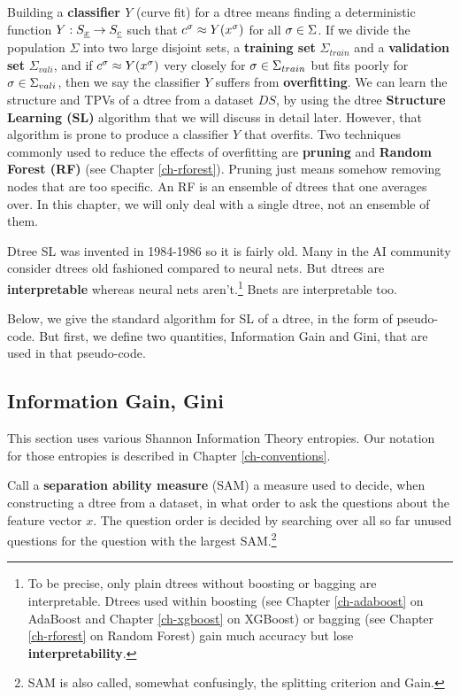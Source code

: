 Building a {\bf classifier $Y$} 
(curve fit) for a dtree means
finding a deterministic
function $Y:S_\rvx\rarrow S_\rvc$ 
such that 
$c^\sigma \approx Y(x^\sigma)$
for all $\sigma\in \Sigma$.
If we divide
the population
$\Sigma$ 
into two large 
disjoint
sets, a {\bf training set} $\Sigma_{train}$
and a {\bf validation set} $\Sigma_{vali}$,
and if $c^\sigma \approx Y(x^\sigma)$ very closely
for $\sigma\in \Sigma_{train}$
but fits poorly
for $\sigma\in \Sigma_{vali}$,
then we say the classifier  $Y$
suffers from {\bf overfitting}.
We can learn the structure
and TPVs of a dtree from a dataset $DS$,
by using the
dtree {\bf Structure Learning (SL)}
algorithm that we will 
discuss in detail later. However,
that algorithm
is prone to produce
a classifier $Y$ that overfits.
Two techniques 
commonly used to 
reduce the effects of overfitting
are {\bf pruning}  and 
{\bf Random Forest (RF)}
(see Chapter \ref{ch-rforest}).
Pruning just means somehow
removing nodes that are
too specific. 
An RF is an ensemble of dtrees 
that one averages over.
In this chapter, we will only deal
with a single dtree,
not an ensemble of them. 

Dtree SL was invented in 1984-1986 so it
is fairly old.
Many in the AI
community 
consider dtrees old fashioned
compared to neural nets.
But dtrees 
are {\bf interpretable} whereas neural nets aren't.\footnote{
To be precise, only
plain dtrees without boosting or
 bagging
are interpretable.
Dtrees used within boosting
(see Chapter \ref{ch-adaboost} on AdaBoost
and
Chapter \ref{ch-xgboost} on XGBoost)
or bagging
(see Chapter \ref{ch-rforest} on Random Forest)
gain much
accuracy but lose
{\bf interpretability}.}
Bnets are interpretable too.


Below,
we give the standard
algorithm for SL
of a dtree, in the form
of pseudo-code.
But first,
we define
two quantities,
Information Gain and
Gini,
that are 
used in that 
pseudo-code.


\subsection{Information Gain, Gini}
This section uses various Shannon Information Theory
entropies. Our 
notation for those
entropies
is described in Chapter \ref{ch-conventions}.


Call a {\bf separation ability measure} (SAM)
a measure used 
to decide, when 
constructing a dtree from a dataset,
in what order 
to ask the questions
about the feature vector $x$.
The question order is decided
by searching 
over all so far unused questions
for the question with 
the largest SAM.\footnote{SAM
is also called, somewhat
confusingly, the splitting
criterion and Gain.}



